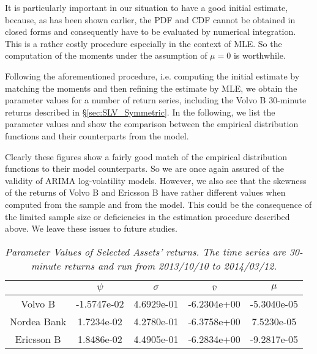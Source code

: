 It is particularly important in our situation to have a good initial
estimate, because, as has been shown earlier, the PDF and CDF cannot
be obtained in closed forms and consequently have to be evaluated by
numerical integration. This is a rather costly procedure especially in
the context of MLE. So the computation of the moments under the
assumption of $\mu = 0$ is worthwhile.

Following the aforementioned procedure, i.e. computing the initial
estimate by matching the moments and then refining the estimate by
MLE, we obtain the parameter values for a number of return series,
including the Volvo B 30-minute returns described in
\S\ref{sec:SLV_Symmetric}. In the following, we list the parameter
values and show the comparison between the empirical distribution
functions and their counterparts from the model.

Clearly these figures show a fairly good match of the empirical
distribution functions to their model counterparts. So we are once
again assured of the validity of ARIMA log-volatility models. However,
we also see that the skewness of the returns of Volvo B and Ericsson B
have rather different values when computed from the sample and from
the model. This could be the consequence of the limited sample size or
deficiencies in the estimation procedure described above. We leave
these issues to future studies.


\begin{table}[htb!]
  \centering
  \begin{tabular}{|c|c|c|c|c|}
    \hline
    & $\psi$ & $\sigma$ & $\bar{v}$ & $\mu$ \\
    \hline
    Volvo B & -1.5747e-02 & 4.6929e-01 & -6.2304e+00 &
    -5.3040e-05 \\
    Nordea Bank & 1.7234e-02 & 4.2780e-01 & -6.3758e+00 & 7.5230e-05
    \\
    Ericsson B & 1.8486e-02 & 4.4905e-01 & -6.2834e+00 & -9.2817e-05 \\
    \hline
  \end{tabular}
  \caption{\small \it Parameter Values of Selected Assets'
    returns. The time series are 30-minute returns and run from
    2013/10/10 to 2014/03/12.}
  \label{tab:assets_params}
\end{table}

